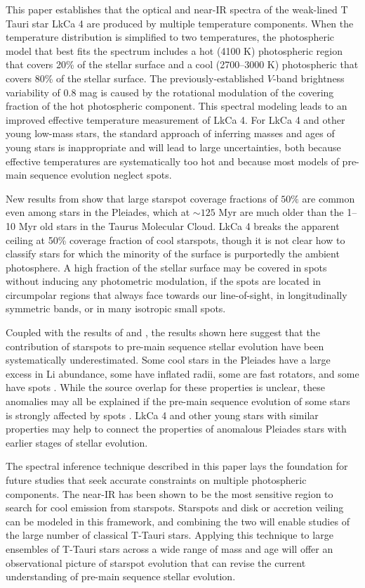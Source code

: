 \documentclass[twocolumn]{emulateapj}%
\begin{document}
This paper establishes that the optical and near-IR spectra of the weak-lined T Tauri star LkCa 4 are produced by multiple temperature components.   When the temperature distribution is simplified to two temperatures, the photospheric model that best fits the spectrum includes a hot (4100 K) photospheric region that covers 20\% of the stellar surface and a cool (2700--3000 K) photospheric that covers 80\% of the stellar surface.  The previously-established $V$-band brightness variability of $0.8$ mag is caused by the rotational modulation of the covering fraction of the hot photospheric component.  This spectral modeling leads to an improved effective temperature measurement of LkCa 4. For LkCa 4 and other young low-mass stars, the standard approach of inferring masses and ages of young stars is inappropriate and will lead to large uncertainties, both because effective temperatures are systematically too hot and because most models of pre-main sequence evolution neglect spots.

New results from \citet{fang2016} show that large starspot coverage fractions of $50\%$ are common even among stars in the Pleiades, which at $\sim 125$ Myr are much older than the 1--10 Myr old stars in the Taurus Molecular Cloud.  LkCa 4 breaks the apparent ceiling at 50\% coverage fraction of cool starspots, though it is not clear how to classify stars for which the minority of the surface is purportedly the ambient photosphere.  A high fraction of the stellar surface may be covered in spots without inducing any photometric modulation, if the spots are located in circumpolar regions that always face towards our line-of-sight, in longitudinally symmetric bands, or in many isotropic small spots.  

Coupled with the results of \citet{fang2016} and \citet{covey16}, the results shown here suggest that the contribution of starspots to pre-main sequence stellar evolution have been systematically underestimated.  
Some cool stars in the Pleiades have a large excess in Li abundance, some have inflated radii, some are fast rotators, and some have spots \citep[e.g.][]{somers15b}.  While the source overlap for these properties is unclear, these anomalies may all be explained if the pre-main sequence evolution of some stars is strongly affected by spots \citep{somers15}.  
LkCa 4 and other young stars with similar properties may help to connect the properties of anomalous Pleiades stars with earlier stages of stellar evolution.


The spectral inference technique described in this paper lays the foundation for future studies that seek accurate constraints on multiple photospheric components.  The near-IR has been shown to be the most sensitive region to search for cool emission from starspots.  Starspots and disk or accretion veiling can be modeled in this framework, and combining the two will enable studies of the large number of classical T-Tauri stars.  Applying this technique to large ensembles of T-Tauri stars across a wide range of mass and age will offer an observational picture of starspot evolution that can revise the current understanding of pre-main sequence stellar evolution.  
\end{document}
